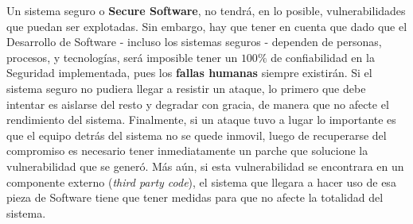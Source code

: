 Un sistema seguro o \textbf{Secure Software}, no tendrá, en lo posible, vulnerabilidades que puedan ser explotadas. Sin embargo, hay que tener en cuenta que dado que el Desarrollo de Software - incluso los sistemas seguros - dependen de personas, procesos, y tecnologías, será imposible tener un \(100\%\) de confiabilidad en la Seguridad implementada, pues los \textbf{fallas humanas} siempre existirán. Si el sistema seguro no pudiera llegar a resistir un ataque, lo primero que debe intentar es aislarse del resto y degradar con gracia, de manera que no afecte el rendimiento del sistema. Finalmente, si un ataque tuvo a lugar lo importante es que el equipo detrás del sistema no se quede inmovil, luego de recuperarse del compromiso es necesario tener inmediatamente un parche que solucione la vulnerabilidad que se generó. Más aún, si esta vulnerabilidad se encontrara en un componente externo (\textit{third party code}), el sistema que llegara a hacer uso de esa pieza de Software tiene que tener medidas para que no afecte la totalidad del sistema.



